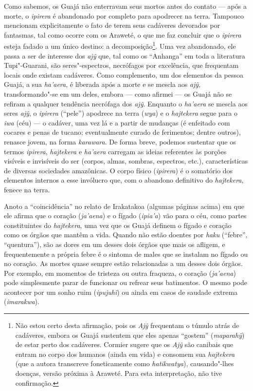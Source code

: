 Como sabemos, os Guajá não enterravam seus mortos antes do contato ---
após a morte, o \emph{ipirera} é abandonado por completo para apodrecer
na terra. Tampouco mencionam explicitamente o fato de terem seus
cadáveres devorados por fantasmas, tal como ocorre com os Araweté, o que
me faz concluir que o \emph{ipirera} esteja fadado a um único destino: a
decomposição\footnote{Não estou certo desta afirmação, pois os
  \emph{Ajỹ} frequentam o túmulo atrás de cadáveres, embora os Guajá
  sustentem que eles apenas ``gostem'' (\emph{maparahỹ}) de estar perto
  dos cadáveres. Cormier sugere que os \emph{Ajỹ} são canibais que
  entram no corpo dos humanos (ainda em vida) e consomem sua
  \emph{hajtekera} (que a autora transcreve foneticamente como
  \emph{hatikwatya}), causando"-lhes doenças, versão próxima à Araweté.
  Para esta interpretação, não tive confirmação.}. Uma vez abandonado,
ele passa a ser de interesse dos \emph{ajỹ} que, tal como os ``Anhanga''
em toda a literatura Tupi"-Guarani, são seres"-espectros, necrófagos por
excelência, que frequentam locais onde existam cadáveres. Como
complemento, um dos elementos da pessoa Guajá, a sua \emph{ha'aera}, é
liberada após a morte e se mescla aos \emph{ajỹ}, transformando"-se em um
deles, embora --- como afirmei --- os Guajá não se refiram a qualquer
tendência necrófaga dos \emph{ajỹ}. Enquanto o \emph{ha'aera} se mescla
aos seres \emph{ajỹ}, o \emph{ipirera} (``pele'') apodrece na terra
(\emph{wya}) e o \emph{hajtekera} segue para o \emph{iwa} (céu) --- o
cadáver, uma vez lá e a partir de mudanças (é enfeitado com cocares e
penas de tucano; eventualmente curado de ferimentos; dentre outros),
renasce jovem, na forma \emph{karawara}. De forma breve, podemos
sustentar que os termos \emph{ipirera}, \emph{hajtekera} e
\emph{ha'aera} carregam as ideias referentes às porções visíveis e
invisíveis do ser (corpos, almas, sombras, espectros, etc.),
características de diversas sociedades amazônicas. O corpo físico
(\emph{ipirera}) é o somatório dos elementos internos a esse invólucro
que, com o abandono definitivo do \emph{hajtekera}, fenece na terra.

Anoto a ``coincidência'' no relato de Irakatakoa (algumas páginas acima)
em que ele afirma que o coração (\emph{ja'aena}) e o fígado
(\emph{ipia'a}) vão para o céu, como partes constituintes do
\emph{hajtekera}, uma vez que os Guajá definem o fígado e coração como
os órgãos que mantêm a vida. Quando não estão doentes por \emph{haku}
(``febre'', ``quentura''), são as dores em um desses dois órgãos que mais os
afligem, e frequentemente a própria febre é o sintoma de males que se
instalam no fígado ou no coração. As mortes quase sempre estão
relacionadas a um desses dois órgãos. Por exemplo, em momentos de
tristeza ou outra fraqueza, o coração (\emph{ja'aena}) pode simplesmente
parar de funcionar ou refrear seus batimentos. O mesmo pode acontecer
por um sonho ruim (\emph{ipujuhĩ}) ou ainda em casos de saudade extrema
(\emph{imarakwa}).

